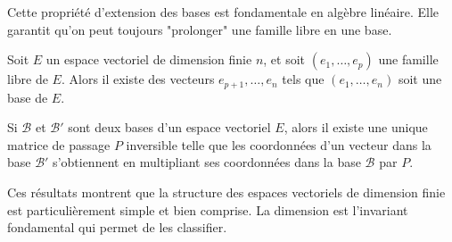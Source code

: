 \begin{rem}
Cette propriété d'extension des bases est fondamentale en algèbre linéaire. Elle garantit qu'on peut toujours "prolonger" une famille libre en une base.
\end{rem}

\begin{thm}
Soit $E$ un espace vectoriel de dimension finie $n$, et soit $(e_1,\ldots,e_p)$ une famille libre de $E$. Alors il existe des vecteurs $e_{p+1},\ldots,e_n$ tels que $(e_1,\ldots,e_n)$ soit une base de $E$.
\end{thm}

\begin{prop}
Si $\mathcal{B}$ et $\mathcal{B}'$ sont deux bases d'un espace vectoriel $E$, alors il existe une unique matrice de passage $P$ inversible telle que les coordonnées d'un vecteur dans la base $\mathcal{B}'$ s'obtiennent en multipliant ses coordonnées dans la base $\mathcal{B}$ par $P$.
\end{prop}

\begin{rem}
Ces résultats montrent que la structure des espaces vectoriels de dimension finie est particulièrement simple et bien comprise. La dimension est l'invariant fondamental qui permet de les classifier.
\end{rem}


